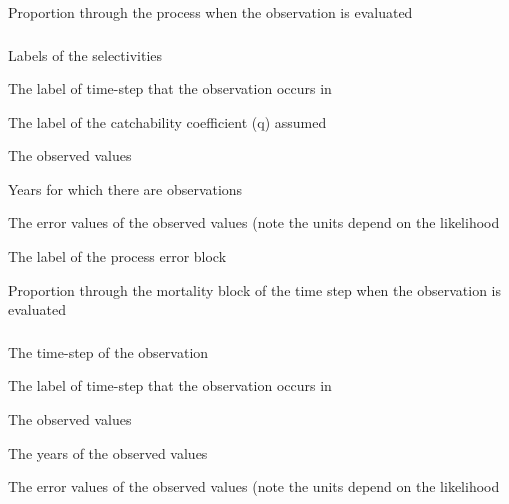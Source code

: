  {Proportion through the process when the observation is evaluated}

\subsubsection[Abundance]{}

 {Labels of the selectivities}

 {The label of time-step that the observation occurs in}

 {The label of the catchability coefficient (q) assumed}

 {The observed values}

 {Years for which there are observations}

 {The error values of the observed values (note the units depend on the likelihood}

 {The label of the process error block}

 {Proportion through the mortality block of the time step when the observation is evaluated}

\subsubsection[Process Biomass]{}

 {The time-step of the observation}

 {The label of time-step that the observation occurs in}

 {The observed values}

 {The years of the observed values}

 {The error values of the observed values (note the units depend on the likelihood}


